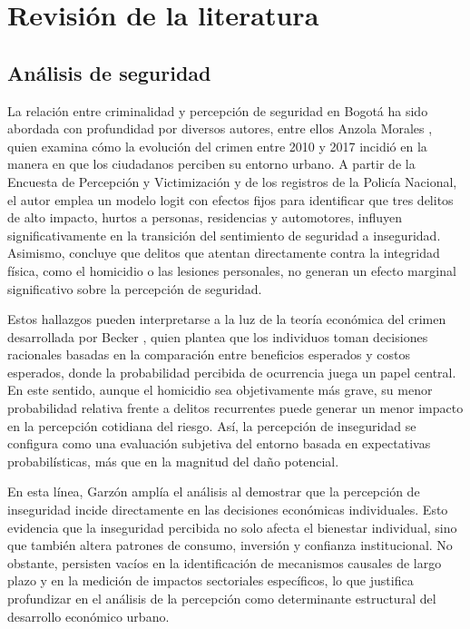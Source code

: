\documentclass[sn-basic,pdflatex]{sn-jnl}
\theoremstyle{remark}
\theoremstyle{definition}
\begin{document}
\section{Revisión de la literatura}\label{revisiuxf3n-de-la-literatura}

\subsection{Análisis de seguridad}\label{anuxe1lisis-de-seguridad}

La relación entre criminalidad y percepción de seguridad en Bogotá ha
sido abordada con profundidad por diversos autores, entre ellos Anzola
Morales \citep{anzola2019}, quien examina cómo la evolución del crimen
entre 2010 y 2017 incidió en la manera en que los ciudadanos perciben su
entorno urbano. A partir de la Encuesta de Percepción y Victimización y
de los registros de la Policía Nacional, el autor emplea un modelo logit
con efectos fijos para identificar que tres delitos de alto impacto,
hurtos a personas, residencias y automotores, influyen
significativamente en la transición del sentimiento de seguridad a
inseguridad. Asimismo, concluye que delitos que atentan directamente
contra la integridad física, como el homicidio o las lesiones
personales, no generan un efecto marginal significativo sobre la
percepción de seguridad.

Estos hallazgos pueden interpretarse a la luz de la teoría económica del
crimen desarrollada por Becker \citep{becker1968}, quien plantea que los
individuos toman decisiones racionales basadas en la comparación entre
beneficios esperados y costos esperados, donde la probabilidad percibida
de ocurrencia juega un papel central. En este sentido, aunque el
homicidio sea objetivamente más grave, su menor probabilidad relativa
frente a delitos recurrentes puede generar un menor impacto en la
percepción cotidiana del riesgo. Así, la percepción de inseguridad se
configura como una evaluación subjetiva del entorno basada en
expectativas probabilísticas, más que en la magnitud del daño potencial.

En esta línea, Garzón \citep{garzon2019} amplía el análisis al demostrar
que la percepción de inseguridad incide directamente en las decisiones
económicas individuales. Esto evidencia que la inseguridad percibida no
solo afecta el bienestar individual, sino que también altera patrones de
consumo, inversión y confianza institucional. No obstante, persisten
vacíos en la identificación de mecanismos causales de largo plazo y en
la medición de impactos sectoriales específicos, lo que justifica
profundizar en el análisis de la percepción como determinante
estructural del desarrollo económico urbano.
\end{document}
